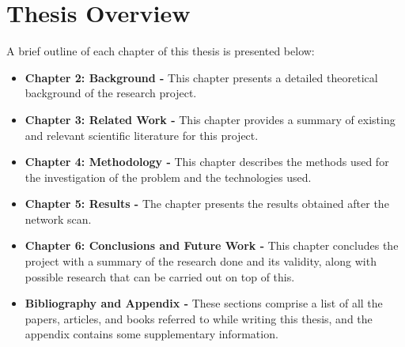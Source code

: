 \section{Thesis Overview}
A brief outline of each chapter of this thesis is presented below:
\begin{itemize}
    \item \textbf{Chapter 2: Background -} This chapter presents a detailed theoretical background of the research project. 
    \item \textbf{Chapter 3: Related Work -} This chapter provides a summary of existing and relevant scientific literature for this project. 
    \item \textbf{Chapter 4: Methodology -} This chapter describes the methods used for the investigation of the problem and the technologies used.
    \item \textbf{Chapter 5: Results -} The chapter presents the results obtained after the network scan.
    \item \textbf{Chapter 6: Conclusions and Future Work -} This chapter concludes the project with a summary of the research done and its validity, along with possible research that can be carried out on top of this.
    \item \textbf{Bibliography and Appendix -} These sections comprise a list of all the papers, articles, and books referred to while writing this thesis, and the appendix contains some supplementary information.
\end{itemize}
